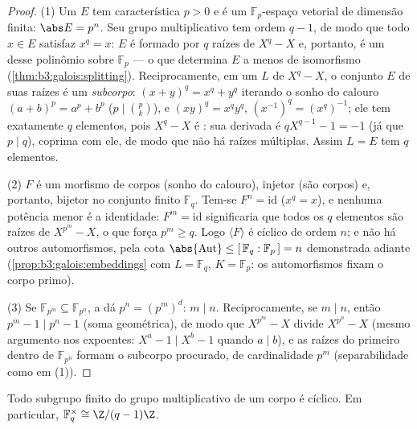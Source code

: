 \begin{proof}
(1) Um  $E$ tem característica $p > 0$ e é um
$\mathbb F_p$-espaço vetorial de dimensão finita: $\abs E = p^n$. Seu grupo
multiplicativo tem ordem $q - 1$, de modo que todo $x \in E$ satisfaz
$x^q = x$: $E$ é formado por $q$ raízes de $X^q - X$ e, portanto, é um
 desse polinômio sobre $\mathbb F_p$ --- o que determina
$E$ a menos de isomorfismo (\cref{thm:b3:galois:splitting}). Reciprocamente, em um
 $L$ de $X^q - X$, o conjunto $E$ de suas
raízes é um \emph{subcorpo}: $(x + y)^q = x^q + y^q$ iterando o sonho do calouro $(a+b)^p = a^p + b^p$
($p \mid \binom pk$), e $(xy)^q = x^qy^q$, $(x^{-1})^q = (x^q)^{-1}$; ele tem exatamente $q$ elementos, pois
$X^q - X$ é : sua derivada é $qX^{q-1} - 1 = -1$ (já que $p \mid q$), coprima com
ele, de modo que não há raízes múltiplas. Assim $L = E$ tem $q$
elementos.

(2) $F$ é um morfismo de corpos (sonho do calouro), injetor (são
corpos) e, portanto, bijetor no conjunto finito $\mathbb F_q$. Tem-se $F^n =
\mathrm{id}$
($x^q = x$), e nenhuma potência menor é a identidade: $F^m = \mathrm{id}$ significaria
que todos os $q$ elementos são raízes de $X^{p^m} - X$, o que força $p^m \geq q$.
Logo $\langle F\rangle$ é cíclico de ordem $n$; e não há outros automorfismos,
pela cota $\abs{\operatorname{Aut}} \leq [\,\mathbb F_q :
\mathbb F_p\,] = n$ demonstrada adiante (\cref{prop:b3:galois:embeddings} com $L = \mathbb F_q$, $K =
\mathbb F_p$:
os automorfismos fixam o corpo primo).

(3) Se $\mathbb F_{p^m} \subseteq \mathbb F_{p^n}$, a  dá $p^n = (p^m)^d$: $m \mid n$. Reciprocamente, se $m \mid n$,
então $p^m - 1 \mid p^n - 1$ (soma geométrica), de modo que $X^{p^m} - X$ divide $X^{p^n} - X$ (mesmo
argumento nos expoentes: $X^{a} - 1 \mid X^{b}
- 1$ quando $a \mid b$), e as raízes do primeiro
dentro de $\mathbb F_{p^n}$ formam o subcorpo procurado, de cardinalidade
$p^m$ (separabilidade como em (1)).
\end{proof}

\begin{theorem}[Ciclicidade]\label{thm:b3:galois:cyclic}
Todo subgrupo finito do grupo multiplicativo de um corpo é cíclico. Em
particular, $\mathbb F_q^\times \cong
\Z/(q-1)\Z$.
\end{theorem}


